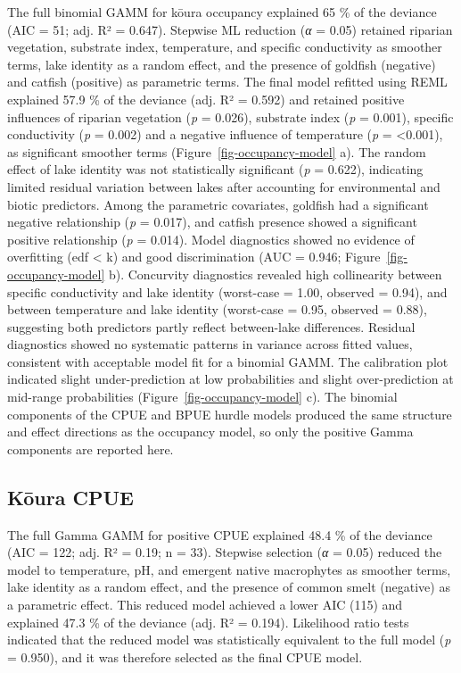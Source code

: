 \documentclass[
  letterpaper,
  DIV=11,
  numbers=noendperiod]{scrartcl}
\begin{document}
The full binomial GAMM for kōura occupancy explained 65 \% of the
deviance (AIC = 51; adj. R² = 0.647). Stepwise ML reduction (\emph{α} =
0.05) retained riparian vegetation, substrate index, temperature, and
specific conductivity as smoother terms, lake identity as a random
effect, and the presence of goldfish (negative) and catfish (positive)
as parametric terms. The final model refitted using REML explained 57.9
\% of the deviance (adj. R² = 0.592) and retained positive influences of
riparian vegetation (\emph{p} = 0.026), substrate index (\emph{p} =
0.001), specific conductivity (\emph{p} = 0.002) and a negative
influence of temperature (\emph{p} = \textless0.001), as significant
smoother terms (Figure~\ref{fig-occupancy-model} a). The random effect
of lake identity was not statistically significant (\emph{p} = 0.622),
indicating limited residual variation between lakes after accounting for
environmental and biotic predictors. Among the parametric covariates,
goldfish had a significant negative relationship (\emph{p} = 0.017), and
catfish presence showed a significant positive relationship (\emph{p} =
0.014). Model diagnostics showed no evidence of overfitting (edf
\textless{} k) and good discrimination (AUC = 0.946;
Figure~\ref{fig-occupancy-model} b). Concurvity diagnostics revealed
high collinearity between specific conductivity and lake identity
(worst-case = 1.00, observed = 0.94), and between temperature and lake
identity (worst-case = 0.95, observed = 0.88), suggesting both
predictors partly reflect between-lake differences. Residual diagnostics
showed no systematic patterns in variance across fitted values,
consistent with acceptable model fit for a binomial GAMM. The
calibration plot indicated slight under-prediction at low probabilities
and slight over-prediction at mid-range probabilities
(Figure~\ref{fig-occupancy-model} c). The binomial components of the
CPUE and BPUE hurdle models produced the same structure and effect
directions as the occupancy model, so only the positive Gamma components
are reported here.

\subsection{Kōura CPUE}\label{kux14dura-cpue}

The full Gamma GAMM for positive CPUE explained 48.4 \% of the deviance
(AIC = 122; adj. R² = 0.19; n = 33). Stepwise selection (\emph{α} =
0.05) reduced the model to temperature, pH, and emergent native
macrophytes as smoother terms, lake identity as a random effect, and the
presence of common smelt (negative) as a parametric effect. This reduced
model achieved a lower AIC (115) and explained 47.3 \% of the deviance
(adj. R² = 0.194). Likelihood ratio tests indicated that the reduced
model was statistically equivalent to the full model (\emph{p} = 0.950),
and it was therefore selected as the final CPUE model.
\end{document}
